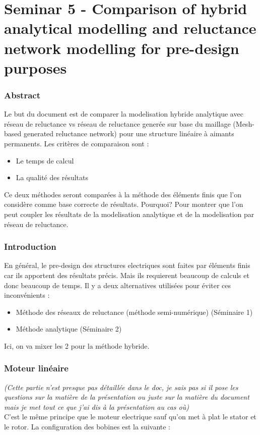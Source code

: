 \part{Seminar 5 - Comparison of hybrid analytical modelling and reluctance
network modelling for pre-design purposes}


\section*{Abstract}

Le but du document est de comparer la modelisation hybride analytique avec réseau de reluctance vs réseau de reluctance generée sur base du maillage (Mesh-based generated reluctance network) pour une structure linéaire à aimants permanents. Les critères de comparaison sont : \begin{itemize}
    \item Le temps de calcul
    \item La qualité des résultats
\end{itemize} 
Ce deux méthodes seront comparées à la méthode des éléments finis que l'on considère comme base correcte de résultats. Pourquoi? Pour montrer que l'on peut coupler les résultats de la modelisation analytique et de la modelisation par réseau de reluctance.
\section{Introduction}
En général, le pre-design des structures electriques sont faites par éléments finis car ils apportent des résultats précis. Mais ils requierent beaucoup de calculs et donc beaucoup de temps. Il y a deux alternatives utilisées pour éviter ces inconvénients : 
\begin{itemize}
    \item Méthode des réseaux de reluctance (méthode semi-numérique) (Séminaire 1)
    \item Méthode analytique (Séminaire 2)
\end{itemize}
Ici, on va mixer les 2 pour la méthode hybride.
\section{Moteur linéaire}
\textit{(Cette partie n'est presque pas détaillée dans le doc, je sais pas si il pose les questions sur la matière de la présentation ou juste sur la matière du document mais je met tout ce que j'ai dis à la présentation au cas où)}\\
C'est le même principe que le moteur electrique sauf qu'on met à plat le stator et le rotor. La configuration des bobines est la suivante :

